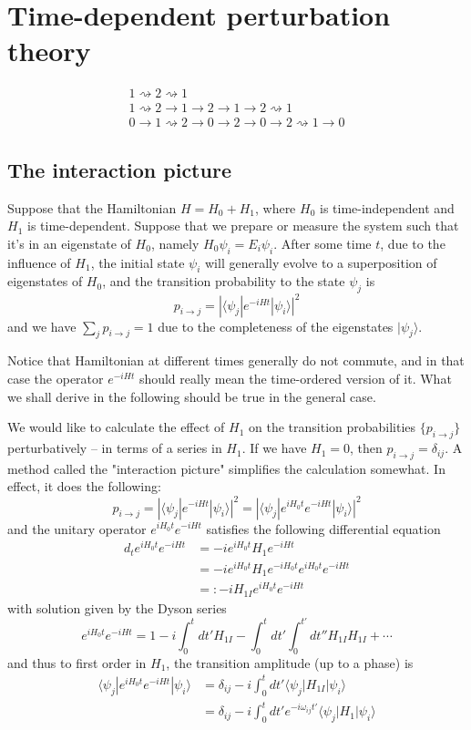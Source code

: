 \documentclass[12pt, oneside]{book}
\begin{document}
\tableofcontents
	
\chapter{Time-dependent perturbation theory}
\begin{gather*}
1\rightsquigarrow2\rightsquigarrow1\\
1\rightsquigarrow2\rightarrow1\rightarrow2\rightarrow1\rightarrow2\rightsquigarrow1\\
0\rightarrow1\rightsquigarrow2\rightarrow0\rightarrow2\rightarrow0\rightarrow2\rightsquigarrow1\rightarrow0
\end{gather*}

\section*{The interaction picture}
Suppose that the Hamiltonian $H=H_0+H_1$, where $H_0$ is time-independent and $H_1$ is time-dependent. Suppose that we prepare or measure the system such that it's in an eigenstate of $H_0$, namely $H_0\psi_i=E_i\psi_i$. After some time $t$, due to the influence of $H_1$, the initial state $\psi_i$ will generally evolve to a superposition of eigenstates of $H_0$, and the transition probability to the state $\psi_j$ is
\[
p_{i\to j}=|\langle\psi_j|e^{-iHt}|\psi_i\rangle|^2
\]
and we have $\sum_jp_{i\to j}=1$ due to the completeness of the eigenstates $|\psi_j\rangle$.

Notice that Hamiltonian at different times generally do not commute, and in that case the operator $e^{-iHt}$ should really mean the time-ordered version of it. What we shall derive in the following should be true in the general case.

We would like to calculate the effect of $H_1$ on the transition probabilities $\{p_{i\to j}\}$ perturbatively -- in terms of a series in $H_1$. If we have $H_1=0$, then $p_{i\to j}=\delta_{ij}$. A method called the "interaction picture" simplifies the calculation somewhat. In effect, it does the following:
\[
p_{i\to j}=|\langle\psi_j|e^{-iHt}|\psi_i\rangle|^2=|\langle\psi_j|e^{iH_0t}e^{-iHt}|\psi_i\rangle|^2
\]
and the unitary operator $e^{iH_0t}e^{-iHt}$ satisfies the following differential equation
\begin{align*}
d_te^{iH_0t}e^{-iHt}
&=-ie^{iH_0t}H_1e^{-iHt}\\
&=-ie^{iH_0t}H_1e^{-iH_0t}e^{iH_0t}e^{-iHt}\\
&=:-iH_{1I}e^{iH_0t}e^{-iHt}
\end{align*}
with solution given by the Dyson series
\[
e^{iH_0t}e^{-iHt}=1-i\int_0^tdt'H_{1I}-\int_0^tdt'\int_0^{t'}dt''H_{1I}H_{1I}+\cdots
\]
and thus to first order in $H_1$, the transition amplitude (up to a phase) is
\begin{align*}
\langle\psi_j|e^{iH_0t}e^{-iHt}|\psi_i\rangle
&=\delta_{ij}-i\int_0^tdt'\langle\psi_j|H_{1I}|\psi_i\rangle\\
&=\delta_{ij}-i\int_0^tdt'e^{-i\omega_{ij}t'}\langle\psi_j|H_1|\psi_i\rangle
\end{align*}
\end{document}
